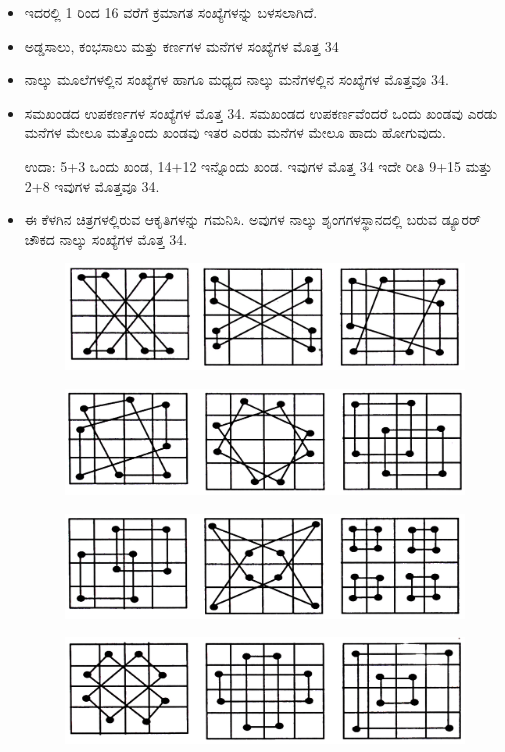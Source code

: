 \begin{itemize}
	\item ಇದರಲ್ಲಿ 1 ರಿಂದ 16 ವರೆಗೆ ಕ್ರಮಾಗತ ಸಂಖ್ಯೆಗಳನ್ನು ಬಳಸಲಾಗಿದೆ.
	\item ಅಡ್ಡಸಾಲು, ಕಂಭಸಾಲು ಮತ್ತು ಕರ್ಣಗಳ ಮನೆಗಳ ಸಂಖ್ಯೆಗಳ ಮೊತ್ತ 34
	\item ನಾಲ್ಕು ಮೂಲೆಗಳಲ್ಲಿನ ಸಂಖ್ಯೆಗಳ ಹಾಗೂ ಮಧ್ಯದ ನಾಲ್ಕು ಮನೆಗಳಲ್ಲಿನ ಸಂಖ್ಯೆಗಳ ಮೊತ್ತವೂ 34.
	\item ಸಮಖಂಡದ ಉಪಕರ್ಣಗಳ ಸಂಖ್ಯೆಗಳ ಮೊತ್ತ 34. ಸಮಖಂಡದ ಉಪಕರ್ಣ\-ವೆಂದರೆ ಒಂದು ಖಂಡವು ಎರಡು ಮನೆಗಳ ಮೇಲೂ ಮತ್ತೊಂದು ಖಂಡವು ಇತರ ಎರಡು ಮನೆಗಳ ಮೇಲೂ ಹಾದು ಹೋಗುವುದು.

	ಉದಾ: 5+3 ಒಂದು ಖಂಡ, 14+12 ಇನ್ನೊಂದು ಖಂಡ. ಇವುಗಳ ಮೊತ್ತ 34 ಇದೇ ರೀತಿ 9+15 ಮತ್ತು 2+8 ಇವುಗಳ ಮೊತ್ತವೂ 34.
	\item ಈ ಕೆಳಗಿನ ಚಿತ್ರಗಳಲ್ಲಿರುವ ಆಕೃತಿಗಳನ್ನು ಗಮನಿಸಿ. ಅವುಗಳ ನಾಲ್ಕು ಶೃಂಗಗಳ\break ಸ್ಥಾನದಲ್ಲಿ ಬರುವ ಡ್ಯೂರರ್ ಚೌಕದ ನಾಲ್ಕು ಸಂಖ್ಯೆಗಳ ಮೊತ್ತ 34.
	\begin{figure}[H]
	\includegraphics[scale=.75]{src/figures/chap4/fig4.16.jpg}
	\end{figure}
	\begin{figure}[H]
	\includegraphics[scale=.8]{src/figures/chap4/fig4.17.jpg}
	\end{figure}
	\begin{figure}[H]
	\includegraphics[scale=.8]{src/figures/chap4/fig4.18.jpg}
	\end{figure}
	\begin{figure}[H]
	\includegraphics[scale=.8]{src/figures/chap4/fig4.19.jpg}
	\end{figure}


\end{itemize}
